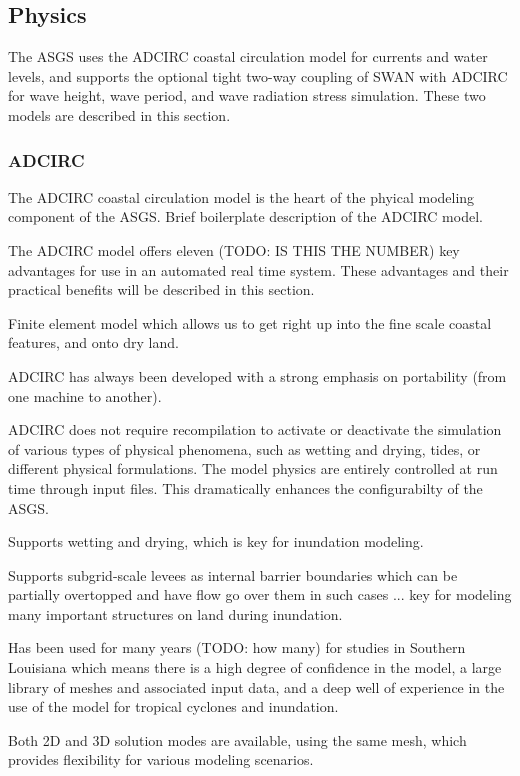 \documentclass[12pt]{article}
\begin{document}
\subsection{Physics}

The ASGS uses the ADCIRC coastal circulation model for currents and water
levels, and supports the optional tight two-way coupling of SWAN with ADCIRC 
for wave height, wave period, and wave radiation stress simulation. These
two models are described in this section. 

\subsubsection{ADCIRC}

The ADCIRC coastal circulation model is the heart of the phyical 
modeling component of the ASGS. Brief boilerplate description of the 
ADCIRC model. 

The ADCIRC model offers eleven (TODO: IS THIS THE NUMBER) key 
advantages for use in an automated real time system. These 
advantages and their practical benefits will be described in this 
section. 

Finite element model which allows us to get right up into the fine 
scale coastal features, and onto dry land. 

ADCIRC has always been developed with a strong emphasis on 
portability (from one machine to another). 

ADCIRC does not require recompilation to activate or deactivate the 
simulation of various types of physical phenomena, such as wetting 
and drying, tides, or different physical formulations. The model 
physics are entirely controlled at run time through input files. 
This dramatically enhances the configurabilty of the ASGS. 

Supports wetting and drying, which is key for inundation modeling.

Supports subgrid-scale levees as internal barrier boundaries which 
can be partially overtopped and have flow go over them in such cases 
... key for modeling many important structures on land during 
inundation. 

Has been used for many years (TODO: how many) for studies in 
Southern Louisiana which means there is a high degree of confidence 
in the model, a large library of meshes and associated input data, 
and a deep well of experience in the use of the model for tropical 
cyclones and inundation. 

Both 2D and 3D solution modes are available, using the same mesh, 
which provides flexibility for various modeling scenarios. 
\end{document}
